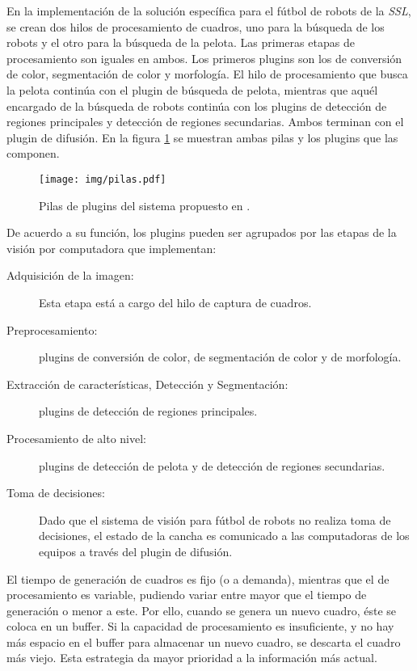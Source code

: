 En la implementación de la solución específica para el fútbol de robots de la
\emph{SSL}, se crean dos hilos de procesamiento de cuadros, uno para la búsqueda
de los robots y el otro para la búsqueda de la pelota. Las primeras etapas de
procesamiento son iguales en ambos. Los primeros plugins son los de conversión
de color, segmentación de color y morfología. El hilo de procesamiento que busca
la pelota continúa con el plugin de búsqueda de pelota, mientras que aquél
encargado de la búsqueda de robots continúa con los plugins de detección de
regiones principales y detección de regiones secundarias. Ambos terminan con el
plugin de difusión. En la figura \ref{pilasPlugins} se muestran ambas pilas y
los plugins que las componen.

\begin{figure}[h]

	\texttt{[image: img/pilas.pdf]}

	\caption{Pilas de plugins del sistema propuesto en \cite{torres2014}.}

	\label{pilasPlugins}

\end{figure}


De acuerdo a su función, los plugins pueden ser agrupados por las etapas de la
visión por computadora que implementan:

\begin{description}

	\item[Adquisición de la imagen:] Esta etapa está a cargo del hilo de
		captura de cuadros.

	\item[Preprocesamiento:] plugins de conversión de color, de segmentación
		de color y de morfología.

	\item[Extracción de características, Detección y Segmentación:] plugins
		de detección de regiones principales.

	\item[Procesamiento de alto nivel:] plugins de detección de pelota y de
		detección de regiones secundarias.

	\item[Toma de decisiones:] Dado que el sistema de visión para fútbol de
		robots no realiza toma de decisiones, el estado de la cancha es
		comunicado a las computadoras de los equipos a través del plugin
		de difusión.

\end{description}

El tiempo de generación de cuadros es fijo (o a demanda), mientras que el de
procesamiento es variable, pudiendo variar entre mayor que el tiempo de
generación o menor a este. Por ello, cuando se genera un nuevo cuadro, éste se
coloca en un buffer. Si la capacidad de procesamiento es insuficiente, y no
hay más espacio en el buffer para almacenar un nuevo cuadro, se descarta el
cuadro más viejo. Esta estrategia da mayor prioridad a la información más
actual.

